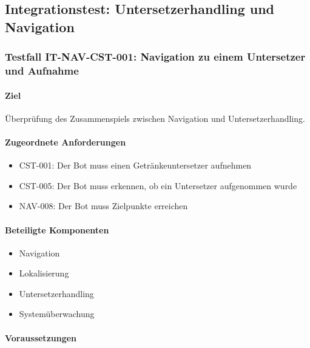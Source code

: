 \subsection{Integrationstest: Untersetzerhandling und
Navigation}\label{integrationstest-untersetzerhandling-und-navigation}

\subsubsection{Testfall IT-NAV-CST-001: Navigation zu einem Untersetzer
und
Aufnahme}\label{testfall-it-nav-cst-001-navigation-zu-einem-untersetzer-und-aufnahme}

\paragraph{Ziel}\label{ziel-13}

Überprüfung des Zusammenspiels zwischen Navigation und
Untersetzerhandling.

\paragraph{Zugeordnete
Anforderungen}\label{zugeordnete-anforderungen-13}

\begin{itemize}
\tightlist
\item
  CST-001: Der Bot muss einen Getränkeuntersetzer aufnehmen
\item
  CST-005: Der Bot muss erkennen, ob ein Untersetzer aufgenommen wurde
\item
  NAV-008: Der Bot muss Zielpunkte erreichen
\end{itemize}

\paragraph{Beteiligte Komponenten}\label{beteiligte-komponenten-4}

\begin{itemize}
\tightlist
\item
  Navigation
\item
  Lokalisierung
\item
  Untersetzerhandling
\item
  Systemüberwachung
\end{itemize}

\paragraph{Voraussetzungen}\label{voraussetzungen-13}

